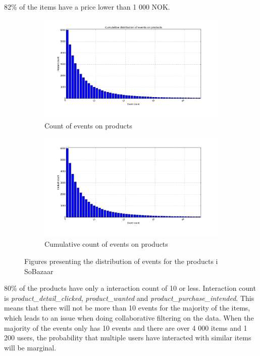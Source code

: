         82\% of the items have a price lower than 1 000 NOK.

    \begin{figure}[H]
        \centering
        \begin{subfigure}{.5\textwidth}
            \includegraphics[width=\dualGraphWidth]{image/product_iddistribution.png}
            \centering
            \caption{Count of events on products}
    \label{figure:eventsPerproduct}
        \end{subfigure}%
        \begin{subfigure}{.5\textwidth}
            \includegraphics[width=\dualGraphWidth]{image/product_idcumdistribution.png}
            \centering
            \caption{Cumulative count of events on products}
    \label{figure:eventsPerproductCum}
        \end{subfigure}
        \caption{Figures presenting the distribution of events for the products i SoBazaar}
    \end{figure}
        80\% of the products have only a interaction count of 10 or less.
        Interaction count is \emph{product\_detail\_clicked}, \emph{product\_wanted} and \emph{product\_purchase\_intended}.
        This means that there will not be more than 10 events for the majority of the items, which leads to an issue when doing collaborative filtering on the data.
        When the majority of the events only has 10 events and there are over 4 000 items and 1 200 users, the probability that multiple users have interacted with similar items will be marginal.

